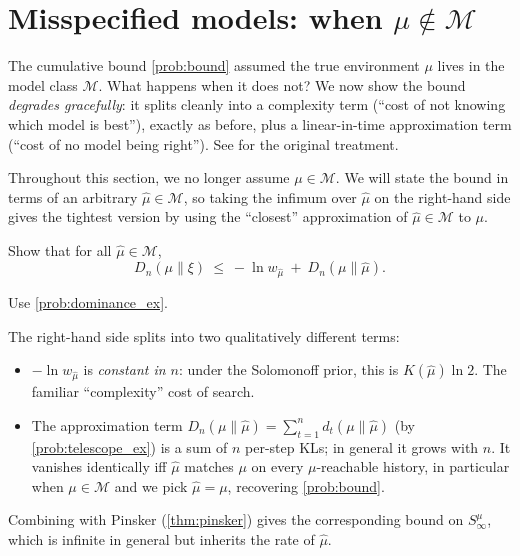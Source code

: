\documentclass[fontsize=11pt, parskip=half]{scrartcl}
\newcommand{\Mc}{\mathcal{M}}
\begin{document}
\section{Misspecified models: when $\mu \notin \Mc$}\label{prob:misspec}

The cumulative bound \cref{prob:bound} assumed the true environment $\mu$ lives
in the model class $\Mc$. What happens when it does not? We now show the
bound \emph{degrades gracefully}: it splits cleanly into a complexity term
(``cost of not knowing which model is best''), exactly as before, plus a
linear-in-time approximation term (``cost of no model being right''). See \cite[\S3.2.8]{Hutter:04uaibook} for the original treatment.

Throughout this section, we no longer assume $\mu \in \Mc$. 
We will state the bound in terms of an arbitrary
$\hat\mu \in \Mc$, so taking the infimum over $\hat\mu$ on the
right-hand side gives the tightest version by using the ``closest''
approximation of $\hat{\mu} \in \Mc$ to $\mu$.
\begin{exercise}
\label{prob:misspec_ex}



Show that for all $\hat\mu \in \Mc$,
\[
  D_n(\mu \parallel \xi) ~\leq~ -\ln w_{\hat\mu} ~+~ D_n(\mu \parallel \hat\mu).
\]

\begin{hint}
Use \cref{prob:dominance_ex}.
\end{hint}
\end{exercise}


\begin{remark}
The right-hand side splits into two qualitatively different terms:
\begin{itemize}\itemsep=2pt
\item $-\ln w_{\hat\mu}$ is \emph{constant in $n$}: under the Solomonoff
prior, this is $K(\hat\mu)\ln 2$. The familiar ``complexity'' cost of search.
\item The approximation term $D_n(\mu \parallel \hat\mu) = \sum_{t=1}^n d_t(\mu \parallel \hat\mu)$ (by \cref{prob:telescope_ex}) is a sum of $n$ per-step KLs; in general it grows with $n$. It vanishes identically iff $\hat\mu$ matches $\mu$ on every $\mu$-reachable history, in particular when $\mu \in \Mc$ and we pick $\hat\mu = \mu$, recovering \cref{prob:bound}.
\end{itemize}
Combining with Pinsker (\cref{thm:pinsker}) gives the corresponding bound on
$S^\mu_\infty$, which is infinite in general but inherits the rate of $\hat\mu$.
\end{remark}
\end{document}
